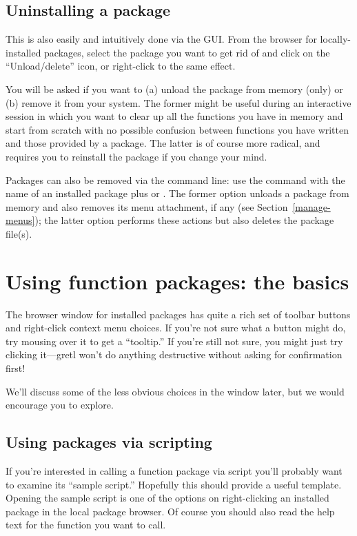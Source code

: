 \documentclass[oneside]{book}
\begin{document}
\subsection{Uninstalling a package}

This is also easily and intuitively done via the GUI. From the
browser for locally-installed packages, select the package you want to
get rid of and click on the ``Unload/delete'' icon, or right-click to
the same effect.

You will be asked if you want to (a) unload the package from memory
(only) or (b) remove it from your system. The former might be useful
during an interactive session in which you want to clear up all the
functions you have in memory and start from scratch with no possible
confusion between functions you have written and those provided by a
package. The latter is of course more radical, and requires you to
reinstall the package if you change your mind.

Packages can also be removed via the command line: use the 
command with the name of an installed package plus  or
. The former option unloads a package from memory and
also removes its menu attachment, if any (see
Section~\ref{manage-menus}); the latter option performs these actions
but also deletes the package file(s).


\section{Using function packages: the basics}

The browser window for installed packages has quite a rich set of
toolbar buttons and right-click context menu choices. If you're not
sure what a button might do, try mousing over it to get a ``tooltip.''
If you're still not sure, you might just try clicking it---gretl won't
do anything destructive without asking for confirmation first!

We'll discuss some of the less obvious choices in the window later,
but we would encourage you to explore.

\subsection{Using packages via scripting}

If you're interested in calling a function package via script you'll
probably want to examine its ``sample script.'' Hopefully this should
provide a useful template. Opening the sample script is one of the
options on right-clicking an installed package in the local package
browser.  Of course you should also read the help text for the
function you want to call.
\end{document}
